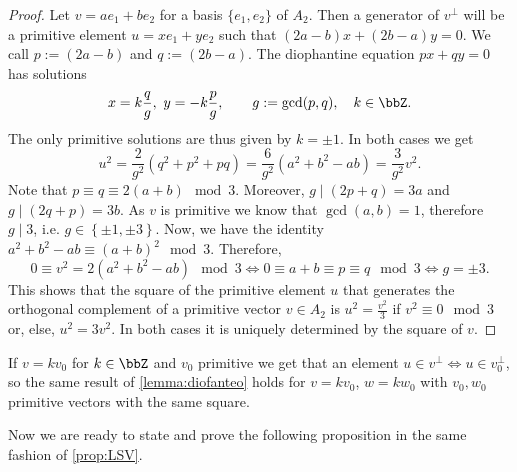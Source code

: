 \documentclass{amsart}
\begin{document}
\begin{proof}
    Let $v=ae_1+be_2$ for a basis $\{e_1, e_2\}$ of $A_2$. Then a generator of $v^{\perp}$ will be a primitive element $u=xe_1+ye_2$ such that $(2a-b)x+(2b-a)y=0$. We call $p:=(2a-b)$ and $q:=(2b-a)$. The diophantine equation $px+qy=0$ has solutions \begin{equation*}
        x=k\frac{q}{g},\ y=-k\frac{p}{g}, \qquad g:=\gcd(p,q),\quad k\in\bbZ.
    \end{equation*}
    The only primitive solutions are thus given by $k=\pm 1$. In both cases we get \begin{equation*}
        u^2=\frac{2}{g^2}\left(q^2+p^2+pq\right)=\frac{6}{g^2}\left(a^2+b^2-ab\right)=\frac{3}{g^2}v^2.
    \end{equation*}
    Note that $p\equiv q\equiv 2(a+b) \mod 3$. Moreover, $g\mid (2p+q)=3a$ and $g\mid (2q+p)=3b$. As $v$ is primitive we know that $\gcd(a,b)=1$, therefore $g\mid 3$, i.e. $g\in\left\{\pm 1,\pm 3\right\}$. Now, we have the identity $a^2+b^2-ab\equiv(a+b)^2 \mod 3$. Therefore,\begin{equation*}
        0\equiv v^2=2(a^2+b^2-ab) \mod 3\iff 0\equiv a+b\equiv p \equiv q\mod 3\iff g=\pm 3.
    \end{equation*}
    This shows that the square of the primitive element $u$ that generates the orthogonal complement of a primitive vector $v\in A_2$ is $u^2=\frac{v^2}{3}$ if $v^2\equiv 0\mod 3$ or, else, $u^2=3v^2$. In both cases it is uniquely determined by the square of $v$. 
\end{proof}
\begin{remark}
    If $v=kv_0$ for $k\in\bbZ$ and $v_0$ primitive we get that an element $u\in v^{\perp}\iff u\in v_0^{\perp}$, so the same result of \autoref{lemma:diofanteo} holds for $v=kv_0$, $w=kw_0$ with $v_0, w_0$ primitive vectors with the same square.
\end{remark}

Now we are ready to state and prove the following proposition in the same fashion of \autoref{prop:LSV}.
\end{document}
